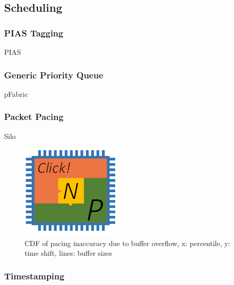 {\subsection{Scheduling}

\subsubsection{PIAS Tagging}

PIAS \cite{bai2014pias}

\subsubsection{Generic Priority Queue}

pFabric \cite{alizadeh2013pfabric}

\subsubsection{Packet Pacing}

Silo \cite{jang2015silo}

\begin{figure}[h!]
	\centering
	\includegraphics[width=0.6\columnwidth]{image/logo}
	\vspace{-0.15in}
	\caption{CDF of pacing inaccuracy due to buffer overflow, x: percentile, y: time shift, lines: buffer sizes}
	\vspace{-0.15in}
	\label{fig:PacingAccuracy}
\end{figure}

\subsubsection{Timestamping}

}
